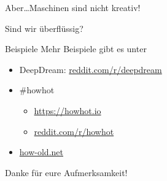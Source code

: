 \begin{frame}{}
    \begin{center}
        \Huge Aber\dots Maschinen sind nicht kreativ!
    \end{center}
\end{frame}


\begin{frame}{}
    \begin{center}
        \Huge Sind wir überflüssig?
    \end{center}
\end{frame}


\begin{frame}{Beispiele}
    Mehr Beispiele gibt es unter

    \begin{itemize}
        \item DeepDream: \href{https://www.reddit.com/r/deepdream/}{reddit.com/r/deepdream}
        \item \#howhot
        \begin{itemize}
            \item \href{https://howhot.io/}{https://howhot.io}
            \item \href{https://www.reddit.com/r/howhot/}{reddit.com/r/howhot}
        \end{itemize}
        \item \href{http://how-old.net/}{how-old.net}
    \end{itemize}

    \begin{center}
        \Huge Danke für eure Aufmerksamkeit!
    \end{center}
\end{frame}
